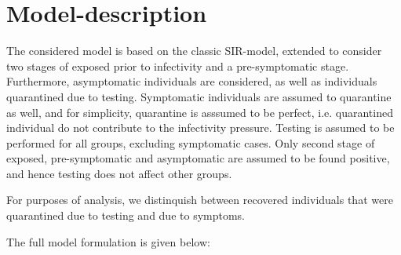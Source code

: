 \documentclass[10pt,a4paper]{article}
\begin{document}



\section{Model-description}

The considered model is based on the classic SIR-model, 
extended to consider two stages of exposed prior to infectivity and a pre-symptomatic stage. 
Furthermore, asymptomatic individuals are considered, as well as individuals quarantined due to testing.
Symptomatic individuals are assumed to quarantine as well, and for simplicity, quarantine is asssumed to be perfect, i.e. quarantined individual do not contribute to the infectivity pressure.
Testing is assumed to be performed for all groups, excluding symptomatic cases. Only second stage of exposed, pre-symptomatic and asymptomatic are assumed to be found positive, and hence testing does not affect other groups. 

For purposes of analysis, we distinquish between recovered individuals that were quarantined due to testing and due to symptoms.

The full model formulation is given below:
\end{document}
